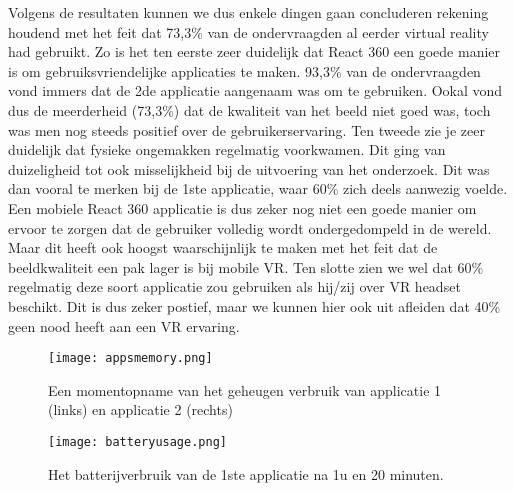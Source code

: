 Volgens de resultaten kunnen we dus enkele dingen gaan concluderen rekening houdend met het feit dat 73,3\% van de ondervraagden al eerder virtual reality had gebruikt. Zo is het ten eerste zeer duidelijk dat React 360 een goede manier is om gebruiksvriendelijke applicaties te maken. 93,3\% van de ondervraagden vond immers dat de 2de applicatie aangenaam was om te gebruiken. Ookal vond dus de meerderheid (73,3\%) dat de kwaliteit van het beeld niet goed was, toch was men nog steeds positief over de gebruikerservaring. Ten tweede zie je zeer duidelijk dat fysieke ongemakken regelmatig voorkwamen. Dit ging van duizeligheid tot ook misselijkheid bij de uitvoering van het onderzoek. Dit was dan vooral te merken bij de 1ste applicatie, waar  60\% zich deels aanwezig voelde. Een mobiele React 360 applicatie is dus zeker nog niet een goede manier om ervoor te zorgen dat de gebruiker volledig wordt ondergedompeld in de wereld. Maar dit heeft ook hoogst waarschijnlijk te maken met het feit dat de beeldkwaliteit een pak lager is bij mobile VR. Ten slotte zien we wel dat 60\% regelmatig deze soort applicatie zou gebruiken als hij/zij over VR headset beschikt. Dit is dus zeker postief, maar we kunnen hier ook uit afleiden dat 40\% geen nood heeft aan een VR ervaring.

\begin{figure}
	\centering
	\texttt{[image: appsmemory.png]}
	\caption{Een momentopname van het geheugen verbruik van applicatie 1 (links) en applicatie 2 (rechts)}
	\label{fig:appsmemory}
\end{figure}

\begin{figure}
	\centering
	\texttt{[image: batteryusage.png]}
	\caption{Het batterijverbruik van de 1ste applicatie na 1u en 20 minuten.}
	\label{fig:batteryusage}
\end{figure}
